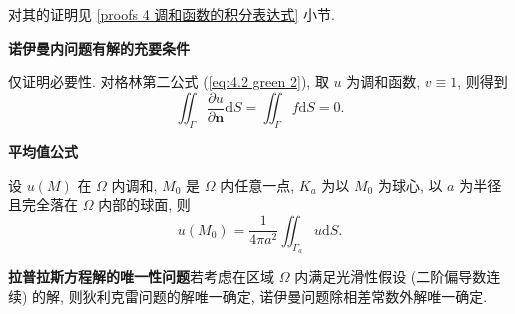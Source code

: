 对其的证明见 \ref{proofs 4 调和函数的积分表达式} 小节.

\textbf{诺伊曼内问题有解的充要条件}

仅证明必要性. 对格林第二公式 (\ref{eq:4.2 green 2}), 取 $u$ 为调和函数, $v\equiv 1$, 则得到
\begin{equation}
    \iint_\Gamma\frac{\partial u}{\partial\boldsymbol{n}}\mathrm{d}S=\iint_\Gamma f\mathrm{d}S=0.
\end{equation}

\textbf{平均值公式}

设 $u(M)$ 在 $\Omega$ 内调和, $M_0$ 是 $\Omega$ 内任意一点, $K_a$ 为以 $M_0$ 为球心, 以 $a$ 为半径且完全落在 $\Omega$ 内部的球面, 则
\begin{equation}
    u(M_0)=\frac{1}{4\pi a^2}\iint_{\Gamma_a}u\mathrm{d}S.
\end{equation}

\textbf{拉普拉斯方程解的唯一性问题}\quad 若考虑在区域 $\Omega$ 内满足光滑性假设 (二阶偏导数连续) 的解, 则狄利克雷问题的解唯一确定, 诺伊曼问题除相差常数外解唯一确定.
